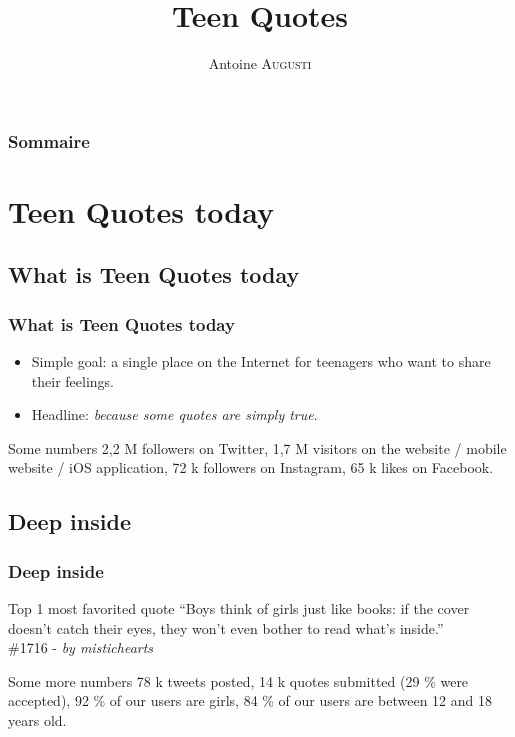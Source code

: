 \documentclass[handout]{beamer}
\title{
	Teen Quotes
}
\author{
	Antoine \textsc{Augusti}
}
\date{}
\begin{document}
	
	\begin{frame}[plain]
		\titlepage
	\end{frame}

	\begin{frame}[plain]
		\frametitle{Sommaire}
		\tableofcontents
	\end{frame}


	\section{Teen Quotes today}

	\subsection{What is Teen Quotes today}
	\begin{frame}
		\frametitle{What is Teen Quotes today}

		\begin{itemize}
			\item Simple goal: a single place on the Internet for teenagers who want to share their feelings.
			\item Headline: \textit{because some quotes are simply true}.
		\end{itemize}

		\begin{exampleblock}{Some numbers}
			2,2 M followers on Twitter, 1,7 M visitors on the website / mobile website / iOS application, 72 k followers on Instagram, 65 k likes on Facebook.
		\end{exampleblock}

	\end{frame}

	\subsection{Deep inside}
	\begin{frame}
		\frametitle{Deep inside}
		\begin{block}{Top 1 most favorited quote}
			``Boys think of girls just like books: if the cover doesn't catch their eyes, they won't even bother to read what's inside.''\\
			\#1716 - \textit{by mistichearts}
		\end{block}

		\begin{exampleblock}{Some more numbers}
			78 k tweets posted, 14 k quotes submitted (29 \% were accepted), 92 \% of our users are girls, 84 \% of our users are between 12 and 18 years old.
		\end{exampleblock}

	\end{frame}
\end{document}
